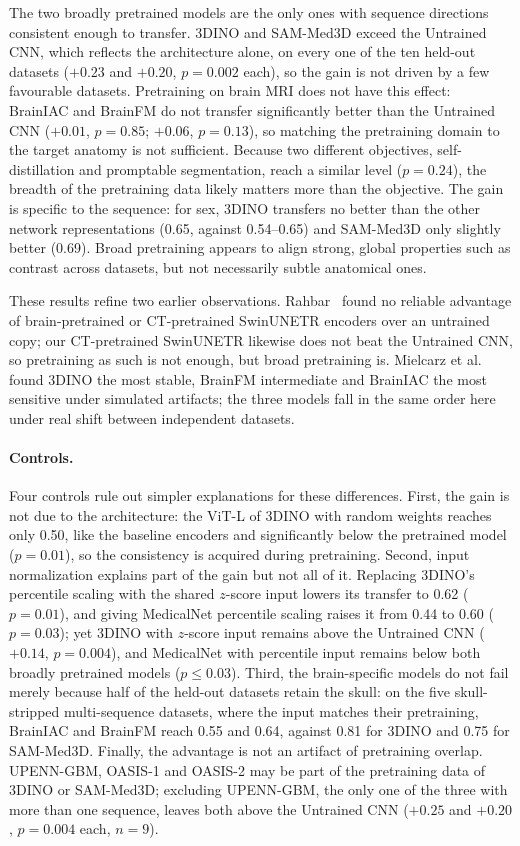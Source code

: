 \documentclass[11pt]{article}
\begin{document}
The two broadly pretrained models are the only ones with sequence directions
consistent enough to transfer. 3DINO and SAM-Med3D exceed the Untrained CNN,
which reflects the architecture alone, on every one of the ten held-out
datasets ($+0.23$ and $+0.20$, $p=0.002$ each), so the gain is not driven by
a few favourable datasets. Pretraining on brain MRI does not have this
effect: BrainIAC and BrainFM do not transfer significantly better than the
Untrained CNN ($+0.01$, $p=0.85$; $+0.06$, $p=0.13$), so matching the
pretraining domain to the target anatomy is not sufficient. Because two
different objectives, self-distillation and promptable segmentation, reach a
similar level ($p=0.24$), the breadth of the pretraining data likely matters
more than the objective. The gain is specific to the sequence: for sex, 3DINO
transfers no better than the other network representations (0.65, against
0.54--0.65) and SAM-Med3D only slightly better (0.69). Broad pretraining
appears to align strong, global properties such as contrast across datasets,
but not necessarily subtle anatomical ones.

These results refine two earlier observations. Rahbar~\cite{rahbar_frozen_2026}
found no reliable advantage of brain-pretrained or CT-pretrained SwinUNETR
encoders over an untrained copy; our CT-pretrained SwinUNETR likewise does not
beat the Untrained CNN, so pretraining as such is not enough, but broad
pretraining is. Mielcarz et al.~\cite{mielcarz_3d_2026} found 3DINO the most
stable, BrainFM intermediate and BrainIAC the most sensitive under simulated
artifacts; the three models fall in the same order here under real shift
between independent datasets.

\paragraph{Controls.}
\label{sec:controls}
Four controls rule out simpler explanations for these differences.
First, the gain is not due to the architecture: the ViT-L of 3DINO with
random weights reaches only 0.50, like the baseline encoders and
significantly below the pretrained model ($p=0.01$), so the consistency is
acquired during pretraining. Second, input normalization explains part of the
gain but not all of it. Replacing 3DINO's percentile scaling with the shared
$z$-score input lowers its transfer to 0.62 ($p=0.01$), and giving MedicalNet
percentile scaling raises it from 0.44 to 0.60 ($p=0.03$); yet 3DINO with
$z$-score input remains above the Untrained CNN ($+0.14$, $p=0.004$), and
MedicalNet with percentile input remains below both broadly pretrained models
($p\le0.03$). Third, the brain-specific models do not fail merely because
half of the held-out datasets retain the skull: on the five skull-stripped
multi-sequence datasets, where the input matches their pretraining, BrainIAC
and BrainFM reach 0.55 and 0.64, against 0.81 for 3DINO and 0.75 for
SAM-Med3D. Finally, the advantage is not an artifact of pretraining overlap.
UPENN-GBM, OASIS-1 and OASIS-2 may be part of the pretraining data of 3DINO
or SAM-Med3D; excluding UPENN-GBM, the only one of the three with more than
one sequence, leaves both above the Untrained CNN ($+0.25$ and $+0.20$,
$p=0.004$ each, $n=9$).
\end{document}
